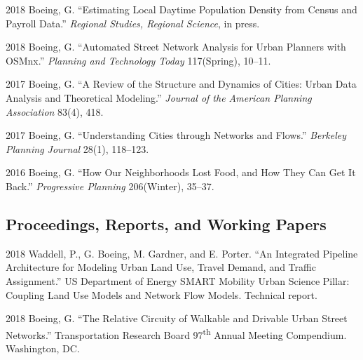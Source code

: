 \documentclass{academiccv}
\begin{document}
\begin{tablist}
	
\item[2018] \tab Boeing, G. \enquote{Estimating Local Daytime Population Density from Census and Payroll Data.} \textit{Regional Studies, Regional Science}, in press.

\item[2018] \tab Boeing, G. \enquote{Automated Street Network Analysis for Urban Planners with OSMnx.} \textit{Planning and Technology Today} 117(Spring), 10--11.
	
\item[2017] \tab Boeing, G. \enquote{A Review of the Structure and Dynamics of Cities: Urban Data Analysis and Theoretical Modeling.} \textit{Journal of the American Planning Association} 83(4), 418.
	
\item[2017] \tab Boeing, G. \enquote{Understanding Cities through Networks and Flows.} \textit{Berkeley Planning Journal} 28(1), 118--123.

\item[2016] \tab Boeing, G. \enquote{How Our Neighborhoods Lost Food, and How They Can Get It Back.} \textit{Progressive Planning} 206(Winter), 35--37.
	
\end{tablist}



\subsection*{Proceedings, Reports, and Working Papers}

\begin{tablist}

\item[2018] \tab Waddell, P., G. Boeing, M. Gardner, and E. Porter. \enquote{An Integrated Pipeline Architecture for Modeling Urban Land Use, Travel Demand, and Traffic Assignment.} US Department of Energy SMART Mobility Urban Science Pillar: Coupling Land Use Models and Network Flow Models. Technical report.

\item[2018] \tab Boeing, G. \enquote{The Relative Circuity of Walkable and Drivable Urban Street Networks.} Transportation Research Board 97\textsuperscript{th} Annual Meeting Compendium. Washington, DC.
	
\end{tablist}
\end{document}
